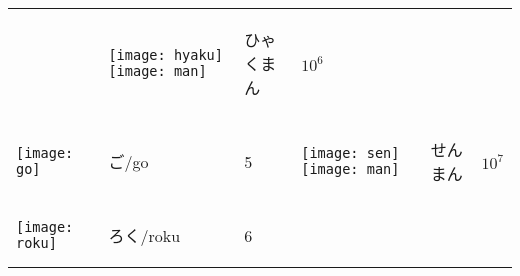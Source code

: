 \documentclass[a4paper,12pt]{extarticle}
\begin{document}
\begin{longtable}{|lll|lll|}
	                                   &
	\begin{minipage}{0.2\textwidth}
		\centerline{
			\texttt{[image: hyaku]}
			\texttt{[image: man]}
		}
	\end{minipage}
	                                   &
	\begin{CJK}{UTF8}{min}ひゃくまん\end{CJK}
	                                   &
	$10^{6}$
	\\
	\begin{minipage}{0.2\textwidth}
		\centerline{
			\texttt{[image: go]}
		}
	\end{minipage}
	                                   &
	\begin{CJK}{UTF8}{min}ご/go\end{CJK}
	                                   &
	5

	                                   &
	\begin{minipage}{0.2\textwidth}
		\centerline{
			\texttt{[image: sen]}
			\texttt{[image: man]}
		}
	\end{minipage}
	                                   &
	\begin{CJK}{UTF8}{min}せんまん\end{CJK}
	                                   &
	$10^{7}$
	\\
	\begin{minipage}{0.2\textwidth}
		\centerline{
			\texttt{[image: roku]}
		}
	\end{minipage}
	                                   &
	\begin{CJK}{UTF8}{min}ろく/roku\end{CJK}
	                                   &
	6


\end{longtable}
\end{document}
